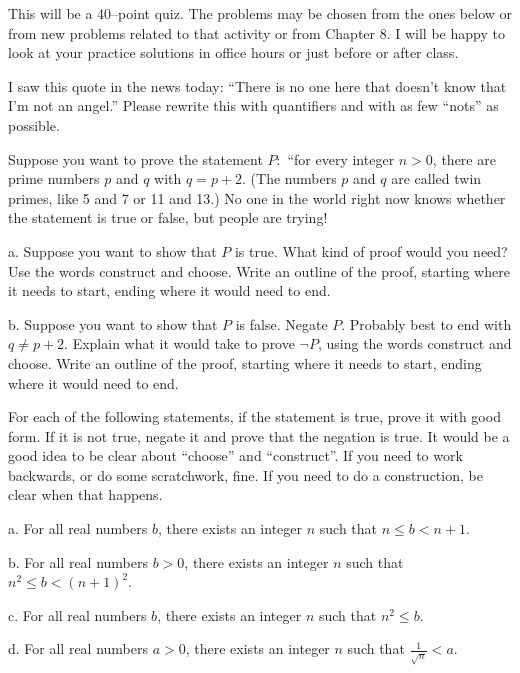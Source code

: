 
This will be a 40--point quiz.
The problems may be chosen from the ones below or from new problems related to that activity or from Chapter 8.
I will be happy to look at your practice solutions in office hours or just before or after class.

\blist{0.1in}
\item I saw this quote in the news today: ``There is no one here that doesn't know that I'm not an angel.''  Please rewrite this with quantifiers and with as few ``nots'' as possible.

\item Suppose you want to prove the statement $P:$ ``for every integer $n > 0$, there are prime numbers $p$ and $q$ with $q = p + 2$.  (The numbers $p$ and $q$ are called twin primes, like 5 and 7 or 11 and 13.)
No one in the world right now knows whether the statement is true or false, but people are trying!

a. Suppose you want to show that $P$ is true.
What kind of proof would you need?  Use the words construct and choose.
Write an outline of the proof, starting where it needs to start, ending where it would need to end. 

b. Suppose you want to show that $P$ is false.  Negate $P$.  Probably best to end with $q \neq p + 2$.
Explain what it would take to prove $\lnot P$, using the words construct and choose.
Write an outline of the proof, starting where it needs to start, ending where it would need to end.

\item For each of the following statements, if the statement is true, prove it with good form.
If it is not true, negate it and prove that the negation is true.
It would be a good idea to be clear about ``choose'' and ``construct''.
If you need to work backwards, or do some scratchwork, fine.
If you need to do a construction, be clear when that happens.

a. For all real numbers $b$, there exists an integer $n$ such that $n \leq b < n+1$.

b. For all real numbers $b > 0$, there exists an integer $n$ such that $n^2 \leq b < (n+1)^2$.

c. For all real numbers $b$, there exists an integer $n$ such that $n^2 \leq b$.

d. For all real numbers $a > 0$, there exists an integer $n$ such that $\frac{1}{\sqrt{n}} < a$.

